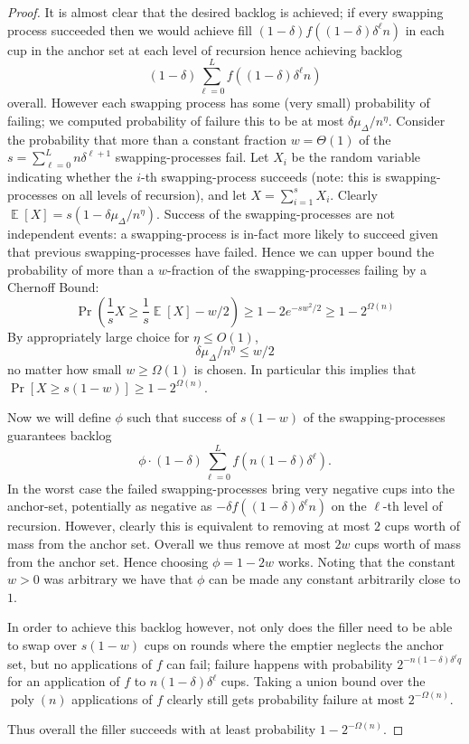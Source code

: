\documentclass[twocolumn]{article}[10pt]
\DeclareMathOperator{\E}{\mathbb{E}}
\DeclareMathOperator{\poly}{\text{poly}}
\begin{document}
\begin{proof}
  It is almost clear that the desired backlog is achieved; if every swapping
  process succeeded then we would achieve fill $(1-\delta)
  f((1-\delta)\delta^\ell n)$ in each cup in the anchor set at each level of
  recursion hence achieving backlog $$(1-\delta)\sum_{\ell=0}^L
  f((1-\delta)\delta^\ell n)$$ overall. However each swapping process has some
  (very small) probability of failing; we computed probability of failure this
  to be at most $\delta \mu_\Delta / n^\eta.$ Consider the probability that
  more than a constant fraction $w = \Theta(1)$ of the $s = \sum_{\ell=0}^L
  n\delta^{\ell+1}$ swapping-processes fail. Let $X_i$ be the random variable
  indicating whether the $i$-th swapping-process succeeds (note: this is
  swapping-processes on all levels of recursion), and let $X=\sum_{i=1}^s X_i$.
  Clearly $\E[X] = s(1-\delta\mu_\Delta/n^\eta)$. Success of the
  swapping-processes are not independent events: a swapping-process is in-fact
  more likely to succeed given that previous swapping-processes have failed.
  Hence we can upper bound the probability of more than a $w$-fraction of the
  swapping-processes failing by a Chernoff Bound: $$\Pr\left(\frac{1}{s}X \ge
  \frac{1}{s}\E[X] - w/2\right) \ge 1-2e^{-s w^2/2} \ge 1-2^{\Omega(n)}$$ By
  appropriately large choice for $\eta \le O(1)$, $$\delta\mu_\Delta /n^\eta
  \le w/2$$ no matter how small $w \ge \Omega(1)$ is chosen. In particular this
  implies that $\Pr[X \ge s(1-w)] \ge 1-2^{\Omega(n)}$.

  Now we will define $\phi$ such that success of $s(1-w)$ of the
  swapping-processes guarantees backlog $$\phi \cdot (1-\delta) \sum_{\ell=0}^L
  f(n(1-\delta)\delta^\ell).$$ In the worst case the failed swapping-processes
  bring very negative cups into the anchor-set, potentially as negative as
  $-\delta f((1-\delta)\delta^\ell n)$ on the $\ell$-th level of recursion.
  However, clearly this is equivalent to removing at most $2$ cups worth of
  mass from the anchor set. Overall we thus remove at most $2w$ cups worth of
  mass from the anchor set. Hence choosing $\phi = 1-2w$ works.
  Noting that the constant $w > 0$ was arbitrary we have that $\phi$ can be
  made any constant arbitrarily close to $1$.

  In order to achieve this backlog however, not only does the filler need to be
  able to swap over $s(1-w)$ cups on rounds where the emptier neglects the
  anchor set, but no applications of $f$ can fail; failure happens with
  probability $2^{-n(1-\delta)\delta^\ell q}$ for an application of $f$ to
  $n(1-\delta)\delta^\ell$ cups. Taking a union bound over the $\poly(n)$
  applications of $f$ clearly still gets probability failure at most
  $2^{-\Omega(n)}$.

  Thus overall the filler succeeds with at least probability $1-2^{-\Omega(n)}$.

\end{proof}
\end{document}
